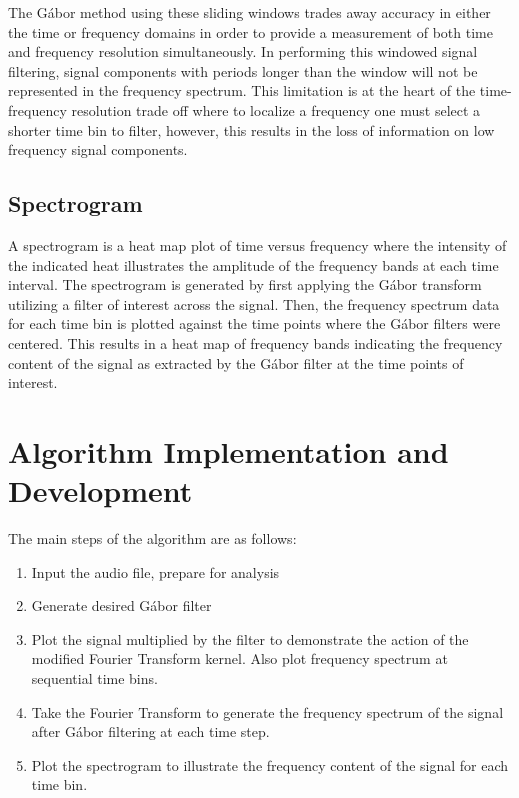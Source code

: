 \documentclass{article}
\begin{document}
The G\'abor method using these sliding windows trades away
accuracy in either the time or frequency domains in order
to provide a measurement of both time and frequency resolution simultaneously. In performing this windowed signal filtering, signal components with periods longer than the window will not be represented in the frequency spectrum. This limitation is at the heart of the time-frequency resolution trade off where to localize a frequency one must select a shorter time bin to filter, however, this results in the loss of information on low frequency signal components.

\subsection{Spectrogram}
A spectrogram is a heat map plot of time versus frequency where the intensity of the indicated heat illustrates the amplitude of the frequency bands at each time interval. The spectrogram is generated by first applying the G\'abor transform utilizing a filter of interest across the signal. Then, the frequency spectrum data for each time bin is plotted against the time points where the G\'abor filters were centered. This results in a heat map of frequency bands indicating the frequency content of the signal as extracted by the G\'abor filter at the time points of interest.

\section{Algorithm Implementation and Development}
The main steps of the algorithm are as follows: 
\begin{enumerate}
    \item Input the audio file, prepare for analysis
    \item Generate desired G\'abor filter
    \item Plot the signal multiplied by the filter to demonstrate the action of the modified Fourier Transform kernel. Also plot frequency spectrum at sequential time bins.
    \item Take the Fourier Transform to generate the frequency spectrum of the signal after G\'abor filtering at each time step.
    \item Plot the spectrogram to illustrate the frequency content of the signal for each time bin.
\end{enumerate}

\end{document}
